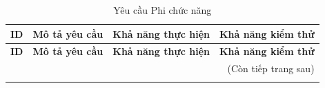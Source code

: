 \setlength\LTleft{\fill}
\setlength\LTright{\fill}
\renewcommand{\arraystretch}{1.2}
\begin{longtable}{p{2.4cm} p{7.0cm} p{2.0cm} p{2.0cm}}
\caption{Yêu cầu Phi chức năng}\label{tab:nfr}\\
\toprule
\textbf{ID} & \textbf{Mô tả yêu cầu} & \textbf{Khả năng thực hiện} & \textbf{Khả năng kiểm thử}  \\
\midrule
\endfirsthead

\toprule
\textbf{ID} & \textbf{Mô tả yêu cầu} & \textbf{Khả năng thực hiện} & \textbf{Khả năng kiểm thử}  \\
\midrule
\endhead

\midrule
\multicolumn{4}{r}{\footnotesize (Còn tiếp trang sau)}\\
\endfoot

\bottomrule
\endlastfoot


\end{longtable}
